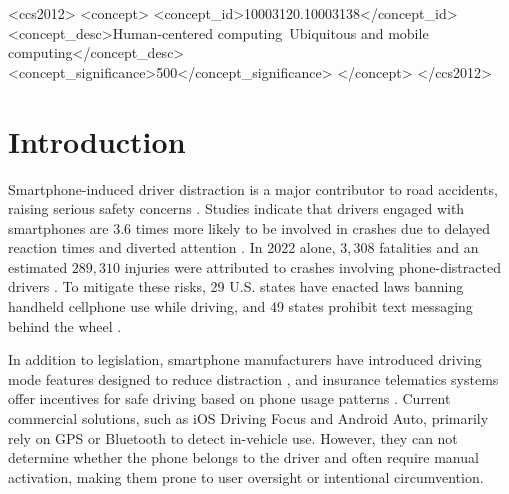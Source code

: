 \documentclass[sigconf]{acmart}
\begin{document}
\begin{CCSXML}
<ccs2012>
   <concept>
       <concept_id>10003120.10003138</concept_id>
       <concept_desc>Human-centered computing~Ubiquitous and mobile computing</concept_desc>
       <concept_significance>500</concept_significance>
       </concept>
 </ccs2012>
\end{CCSXML}






\maketitle


\section{Introduction}
\label{sec:introduction}
Smartphone-induced driver distraction is a major contributor to road accidents, raising serious safety concerns \cite{DriverElectronic}. 
Studies indicate that drivers engaged with smartphones are 3.6 times more likely to be involved in crashes due to delayed reaction times and diverted attention \cite{dingus2016driver}. 
%
In 2022 alone, $3,308$ fatalities and an estimated $289,310$ injuries were attributed to crashes involving phone-distracted drivers \cite{DriverElectronic}.
%
To mitigate these risks, 29 U.S. states have enacted laws banning handheld cellphone use while driving, and 49 states prohibit text messaging behind the wheel \cite{Distracteddriving}.

In addition to legislation, smartphone manufacturers have introduced 
driving mode features designed to reduce distraction \cite{AppleSupport_2024, 
android_auto_2025}, and insurance telematics systems offer incentives for safe driving based on phone usage patterns
\cite{park2018using, wahlstrom2017smartphone}. 
%
Current commercial solutions, such as iOS Driving Focus and Android Auto, primarily rely on GPS or Bluetooth to detect in-vehicle use. However, they can not determine whether the phone belongs to the driver and often require manual activation, making them prone to user oversight or intentional circumvention.
\end{document}

